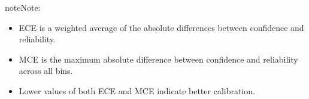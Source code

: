 \documentclass[letterpaper,10pt,english]{sphinxmanual}
\begin{document}
\begin{fulllineitems}
\begin{quote}
\begin{description}
\end{description}\end{quote}

\begin{sphinxadmonition}{note}{Note:}\begin{itemize}
\item {} 
\sphinxAtStartPar
ECE is a weighted average of the absolute differences between confidence and reliability.

\item {} 
\sphinxAtStartPar
MCE is the maximum absolute difference between confidence and reliability across all bins.

\item {} 
\sphinxAtStartPar
Lower values of both ECE and MCE indicate better calibration.

\end{itemize}
\end{sphinxadmonition}

\end{fulllineitems}

\end{document}
